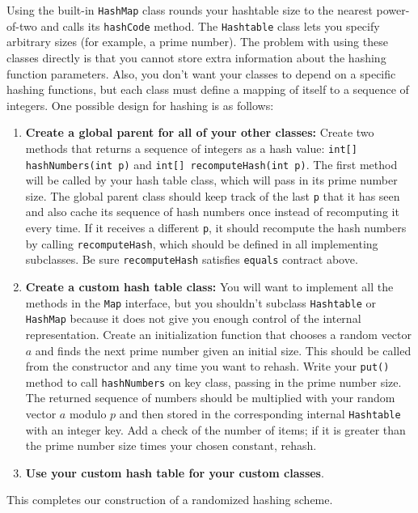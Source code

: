 \documentclass{article}[10pth]
\begin{document}
Using the built-in \texttt{HashMap} class rounds your hashtable size to
the nearest power-of-two and calls its \texttt{hashCode} method.
The \texttt{Hashtable} class lets you specify arbitrary sizes
(for example, a prime number). The problem with using these classes
directly is that you cannot store extra information about the hashing
function parameters. Also, you don't want your classes to depend on a
specific hashing functions, but each class must define a mapping of itself
to a sequence of integers. One possible design for hashing is as follows:

\begin{enumerate}
\item \textbf{Create a global parent for all of your other classes:}
Create two methods that returns a sequence of integers as a hash value:
\texttt{int[] hashNumbers(int p)} and \texttt{int[] recomputeHash(int p)}.
The first method will be called by your
hash table class, which will pass in its prime number size. The global
parent class should keep track of the last \texttt{p} that it has seen and
also cache its sequence of hash numbers once instead of recomputing it every
time.
If it receives a different \texttt{p}, it should recompute the hash numbers
by calling \texttt{recomputeHash}, which should be defined in all
implementing subclasses.
Be sure \texttt{recomputeHash} satisfies
\texttt{equals} contract
above.
\item \textbf{Create a custom hash table class:}
You will want to implement all the methods in the \texttt{Map} interface,
but you shouldn't subclass \texttt{Hashtable}
or \texttt{HashMap} because it does not give you enough control of the
internal representation. Create an
initialization function that chooses a random vector $a$ and finds the
next prime number given an initial size. This should be called from
the constructor and any time you want to rehash.
Write your
\texttt{put()} method to call \texttt{hashNumbers} on key class, passing
in the prime number size. The returned sequence of numbers should be
multiplied with your random vector $a$ modulo $p$ and then stored in the
corresponding internal \texttt{Hashtable} with an integer key.
Add a check of the number of items; if it is greater
than the prime number size times your chosen constant, rehash.
\item \textbf{Use your custom hash table for your custom classes}.
\end{enumerate}

This completes our construction of a randomized hashing scheme.
\end{document}
